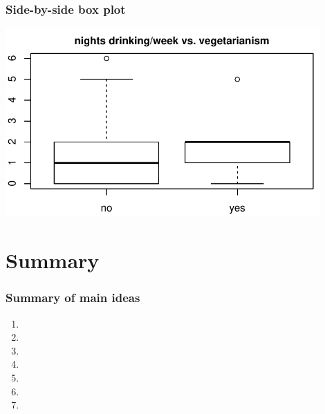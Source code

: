 \documentclass[slidestop,compress,mathserif,12pt,t,professionalfonts,xcolor=table]{beamer}
\begin{document}
\begin{frame}[fragile]
\frametitle{Side-by-side box plot}


\begin{center}
\includegraphics[width=0.9\textwidth]{figures/survey/box_drinks_veg}
\end{center}

\note{

}

\end{frame}


\section{Summary}


\begin{frame}
\frametitle{Summary of main ideas}

\vfill

\begin{enumerate}

\item {}

\item {}

\item {}

\item {}

\item {}

\item {}

\item {}

\end{enumerate}

\vfill

\note{

}

\end{frame}

\end{document}
